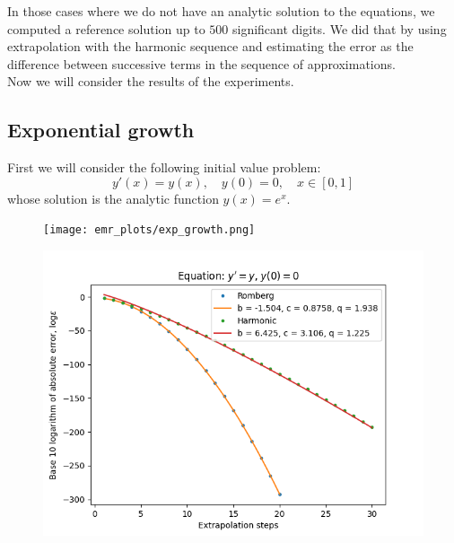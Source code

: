 
In those cases where we do not have an analytic solution to the equations, we computed a reference solution up to \(500\) significant digits. We did that by using extrapolation with the harmonic sequence and estimating the error as the difference between successive terms in the sequence of approximations.\\

Now we will consider the results of the experiments.

\subsection{Exponential growth}
First we will consider the following initial value problem:
\begin{equation}\label{42}
y'(x) = y(x),\quad y(0) = 0, \quad x\in [0,1]
\end{equation}
whose solution is the analytic function \(y(x) = e^x\).

\begin{figure}[H]
\centering
\begin{minipage}{0.45\textwidth}
\centering
\texttt{[image: emr\_plots/exp\_growth.png]}
\end{minipage}
\begin{minipage}{0.45\textwidth}
\centering
\includegraphics[scale=0.45]{emr_plots/exp_growth_hp_steps.png}
\end{minipage}
\end{figure}

